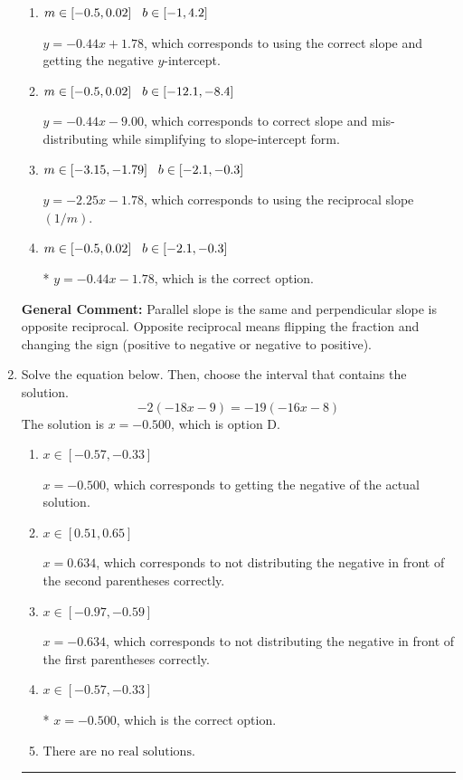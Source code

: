 \documentclass{extbook}[14pt]
\newcommand{\litem}[1]{\item #1

\rule{\textwidth}{0.4pt}}
\begin{document}
\begin{enumerate}
{\begin{enumerate}[label=\Alph*.]
 $y = 0.44x - 6.22$, which corresponds to using the negative slope.
\item \( m \in [-0.5, 0.02] \hspace*{3mm} b \in [-1, 4.2] \)

 $y = -0.44x + 1.78$, which corresponds to using the correct slope and getting the negative $y$-intercept.
\item \( m \in [-0.5, 0.02] \hspace*{3mm} b \in [-12.1, -8.4] \)

 $y = -0.44x - 9.00$, which corresponds to correct slope and mis-distributing while simplifying to slope-intercept form.
\item \( m \in [-3.15, -1.79] \hspace*{3mm} b \in [-2.1, -0.3] \)

 $y = -2.25x - 1.78$, which corresponds to using the reciprocal slope $(1/m)$.
\item \( m \in [-0.5, 0.02] \hspace*{3mm} b \in [-2.1, -0.3] \)

* $y = -0.44x - 1.78$, which is the correct option.
\end{enumerate}

\textbf{General Comment:} Parallel slope is the same and perpendicular slope is opposite reciprocal. Opposite reciprocal means flipping the fraction and changing the sign (positive to negative or negative to positive).
}
\litem{
Solve the equation below. Then, choose the interval that contains the solution.
\[ -2(-18x -9) = -19(-16x -8) \]The solution is \( x = -0.500 \), which is option D.\begin{enumerate}[label=\Alph*.]
\item \( x \in [-0.57, -0.33] \)

$x = -0.500$, which corresponds to getting the negative of the actual solution.
\item \( x \in [0.51, 0.65] \)

$x = 0.634$, which corresponds to not distributing the negative in front of the second parentheses correctly.
\item \( x \in [-0.97, -0.59] \)

$x = -0.634$, which corresponds to not distributing the negative in front of the first parentheses correctly.
\item \( x \in [-0.57, -0.33] \)

* $x = -0.500$, which is the correct option.
\item \( \text{There are no real solutions.} \)


\end{enumerate}}
\end{enumerate}
\end{document}
